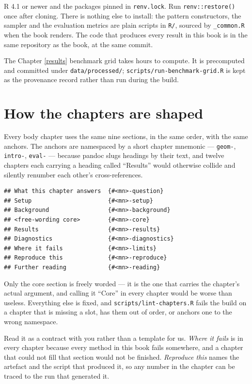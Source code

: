 \documentclass[
  british,
  a4paper,
]{book}
\begin{document}
R 4.1 or newer and the packages pinned in \texttt{renv.lock}. Run \texttt{renv::restore()}
once after cloning. There is nothing else to install: the pattern
constructors, the sampler and the evaluation metrics are plain scripts in \texttt{R/},
sourced by \texttt{\_common.R} when the book renders. The code that produces every
result in this book is in the same repository as the book, at the same commit.

The Chapter \ref{results} benchmark grid takes hours to compute. It is
precomputed and committed under \texttt{data/processed/}; \texttt{scripts/run-benchmark-grid.R}
is kept as the provenance record rather than run during the build.

\section*{How the chapters are shaped}\label{how-the-chapters-are-shaped}

Every body chapter uses the same nine sections, in the same order, with the same
anchors. The anchors are namespaced by a short chapter mnemonic --- \texttt{geom-},
\texttt{intro-}, \texttt{eval-} --- because pandoc slugs headings by their text, and twelve
chapters each carrying a heading called ``Results'' would otherwise collide and
silently renumber each other's cross-references.

\begin{verbatim}
## What this chapter answers  {#<mn>-question}
## Setup                      {#<mn>-setup}
## Background                 {#<mn>-background}
## <free-wording core>        {#<mn>-core}
## Results                    {#<mn>-results}
## Diagnostics                {#<mn>-diagnostics}
## Where it fails             {#<mn>-limits}
## Reproduce this             {#<mn>-reproduce}
## Further reading            {#<mn>-reading}
\end{verbatim}

Only the core section is freely worded --- it is the one that carries the
chapter's actual argument, and calling it ``Core'' in every chapter would be
worse than useless. Everything else is fixed, and \texttt{scripts/lint-chapters.R}
fails the build on a chapter that is missing a slot, has them out of order, or
anchors one to the wrong namespace.

Read it as a contract with you rather than a template for us. \emph{Where it fails}
is in every chapter because every method in this book fails somewhere, and a
chapter that could not fill that section would not be finished. \emph{Reproduce this}
names the artefact and the script that produced it, so any number in the chapter
can be traced to the run that generated it.
\end{document}
